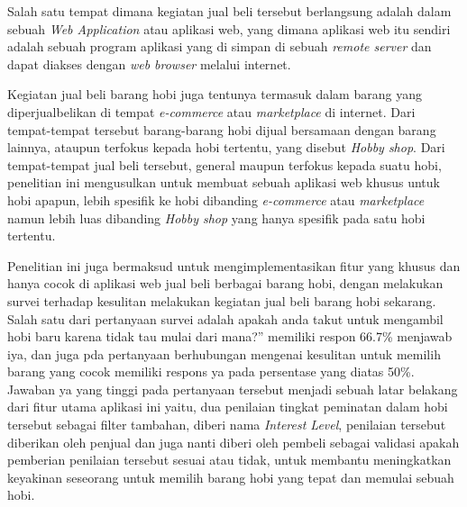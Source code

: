 \documentclass[a4paper]{article}
\begin{document}
Salah satu tempat dimana kegiatan jual beli tersebut berlangsung adalah dalam sebuah \textit{Web Application} atau aplikasi web, yang dimana aplikasi web itu sendiri adalah sebuah program aplikasi yang di simpan di sebuah \textit{remote server} dan dapat diakses dengan \textit{web browser} melalui internet\autocite{what-is-web-app}.


Kegiatan jual beli barang hobi juga tentunya termasuk dalam barang yang diperjualbelikan di tempat \textit{e-commerce} atau \textit{marketplace} di internet. Dari tempat-tempat tersebut barang-barang hobi dijual bersamaan dengan barang lainnya, ataupun terfokus kepada hobi tertentu, yang disebut \textit{Hobby shop}. Dari tempat-tempat jual beli tersebut, general maupun terfokus kepada suatu hobi, penelitian ini mengusulkan untuk membuat sebuah aplikasi web khusus untuk hobi apapun, lebih spesifik ke hobi dibanding \textit{e-commerce} atau \textit{marketplace} namun lebih luas dibanding \textit{Hobby shop} yang hanya spesifik pada satu hobi tertentu.


Penelitian ini juga bermaksud untuk mengimplementasikan fitur yang khusus dan hanya cocok di aplikasi web jual beli berbagai barang hobi, dengan melakukan survei terhadap kesulitan melakukan kegiatan jual beli barang hobi sekarang. Salah satu dari pertanyaan survei adalah apakah anda takut untuk mengambil hobi baru karena tidak tau mulai dari mana?” memiliki respon 66.7\% menjawab iya, dan juga pda pertanyaan berhubungan mengenai kesulitan untuk memilih barang yang cocok memiliki respons ya pada persentase yang diatas 50\%. Jawaban ya yang tinggi pada pertanyaan tersebut menjadi sebuah latar belakang dari fitur utama aplikasi ini yaitu, dua penilaian tingkat peminatan dalam hobi tersebut sebagai filter tambahan, diberi nama \textit{Interest Level}, penilaian tersebut diberikan oleh penjual dan juga nanti diberi oleh pembeli sebagai validasi apakah pemberian penilaian tersebut sesuai atau tidak, untuk membantu meningkatkan keyakinan seseorang untuk memilih barang hobi yang tepat dan memulai sebuah hobi.
\end{document}
